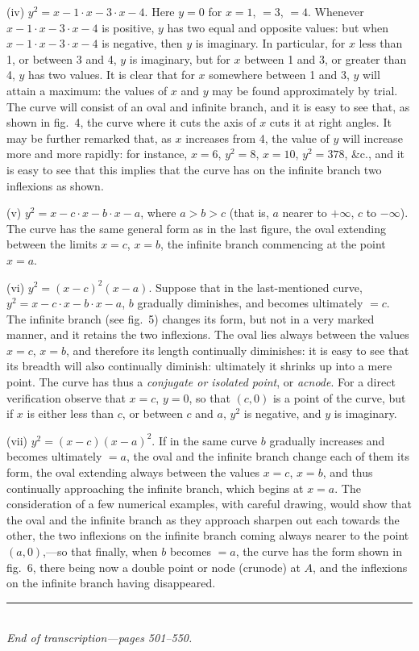 \documentclass[11pt,a4paper]{article}
\begin{document}
(iv) $y^{2} = x - 1 \cdot x - 3 \cdot x - 4$. Here $y = 0$ for $x = 1$, $= 3$, $= 4$. Whenever $x - 1 \cdot x - 3 \cdot x - 4$ is positive, $y$ has two equal and opposite values: but when $x - 1 \cdot x - 3 \cdot x - 4$ is negative, then $y$ is imaginary. In particular, for $x$ less than 1, or between 3 and 4, $y$ is imaginary, but for $x$ between 1 and 3, or greater than 4, $y$ has two values. It is clear that for $x$ somewhere between 1 and 3, $y$ will attain a maximum: the values of $x$ and $y$ may be found approximately by trial. The curve will consist of an oval and infinite branch, and it is easy to see that, as shown in fig.~4, the curve where it cuts the axis of $x$ cuts it at right angles. It may be further remarked that, as $x$ increases from 4, the value of $y$ will increase more and more rapidly: for instance, $x = 6$, $y^{2} = 8$, $x = 10$, $y^{2} = 378$, \&c., and it is easy to see that this implies that the curve has on the infinite branch two inflexions as shown.

(v) $y^{2} = x - c \cdot x - b \cdot x - a$, where $a > b > c$ (that is, $a$ nearer to $+\infty$, $c$ to $-\infty$). The curve has the same general form as in the last figure, the oval extending between the limits $x = c$, $x = b$, the infinite branch commencing at the point $x = a$.

(vi) $y^{2} = (x - c)^{2}(x - a)$. Suppose that in the last-mentioned curve, $y^{2} = x - c \cdot x - b \cdot x - a$, $b$ gradually diminishes, and becomes ultimately $= c$. The infinite branch (see fig.~5) changes its form, but not in a very marked manner, and it retains the two inflexions. The oval lies always between the values $x = c$, $x = b$, and therefore its length continually diminishes: it is easy to see that its breadth will also continually diminish: ultimately it shrinks up into a mere point. The curve has thus a \textit{conjugate or isolated point}, or \textit{acnode}. For a direct verification observe that $x = c$, $y = 0$, so that $(c, 0)$ is a point of the curve, but if $x$ is either less than $c$, or between $c$ and $a$, $y^{2}$ is negative, and $y$ is imaginary.

(vii) $y^{2} = (x - c)(x - a)^{2}$. If in the same curve $b$ gradually increases and becomes ultimately $= a$, the oval and the infinite branch change each of them its form, the oval extending always between the values $x = c$, $x = b$, and thus continually approaching the infinite branch, which begins at $x = a$. The consideration of a few numerical examples, with careful drawing, would show that the oval and the infinite branch as they approach sharpen out each towards the other, the two inflexions on the infinite branch coming always nearer to the point $(a, 0)$,---so that finally, when $b$ becomes $= a$, the curve has the form shown in fig.~6, there being now a double point or node (crunode) at $A$, and the inflexions on the infinite branch having disappeared.

\vspace{\baselineskip}
\begin{center}
\rule{0.5\textwidth}{0.4pt}\\[4pt]
\textit{End of transcription---pages 501--550.}
\end{center}
\end{document}
